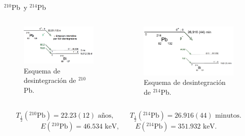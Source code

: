 \documentclass[9pt]{beamer}
\newcommand{\PbCero}{$^{210}$Pb}
\newcommand{\PbCuatro}{$^{214}$Pb}
\begin{document}
\begin{frame}{\PbCero\, y \PbCuatro}
	\begin{columns}

			\begin{column}{0.5\textwidth}
			\begin{figure}
		\centering
		\includegraphics[width=1\textwidth]{Imagenes/210Pb-Paint.png}
		\caption{\justifying Esquema de desintegración de \PbCero\footnotemark[1].}
	\end{figure}
		\end{column}
		\begin{column}{0.5\textwidth}  
			\begin{figure}
		\centering
		\includegraphics[width=1\textwidth]{Imagenes/214Pb-Paint.png}
		\caption{\justifying Esquema de desintegración de \PbCuatro\footnotemark[1].}
	\end{figure}
		\end{column}
	\end{columns}
	\begin{equation}
		T_{\frac{1}{2}}(^{210}\text{Pb}) = 22.23(12) \text{ años,} \hspace{1cm } T_{\frac{1}{2}}(^{214}\text{Pb}) = 26.916(44) \text{ minutos.} 
	\end{equation}
		\begin{equation}
		E(^{210}\text{Pb}) = 46.534 \text{ keV,} \hspace{1cm } E(^{214}\text{Pb}) = 351.932 \text{ keV.} 
	\end{equation}
\end{frame}
\end{document}

